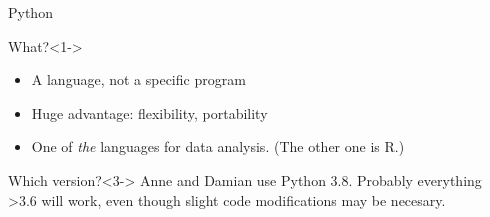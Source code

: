 \documentclass[compress]{beamer}
\begin{document}
\begin{frame}{Python}
\begin{block}{What?}<1->
\begin{itemize}
\item A language, not a specific program
\item Huge advantage: flexibility, portability
\item One of \emph{the} languages for data analysis. \tiny{(The other one is R.)}
\end{itemize}
\end{block}

\begin{block}{Which version?}<3->
Anne and Damian use Python 3.8. Probably everything >3.6 will work, even though slight code modifications may be necesary. \\ 
\end{block}
\end{frame}
\end{document}
